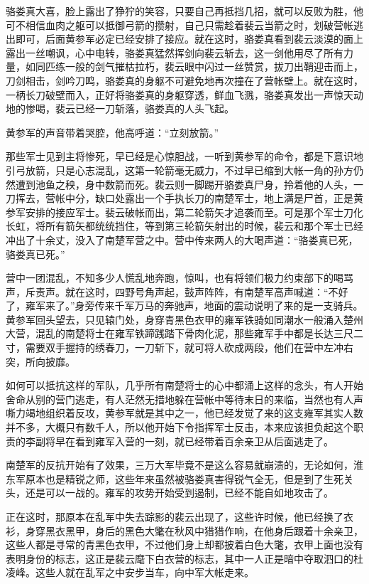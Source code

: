 骆娄真大喜，脸上露出了狰狞的笑容，只要自己再抵挡几招，就可以反败为胜，他可不相信血肉之躯可以抵御弓箭的攒射，自己只需趁着裴云当箭之时，划破营帐逃出即可，后面黄参军必定已经安排了接应。就在这时，骆娄真看到裴云淡漠的面上露出一丝嘲讽，心中电转，骆娄真猛然挥剑向裴云斩去，这一剑他用尽了所有力量，如同匹练一般的剑气摧枯拉朽，裴云眼中闪过一丝赞赏，拔刀出鞘迎击而上，刀剑相击，剑吟刀鸣，骆娄真的身躯不可避免地再次撞在了营帐壁上。就在这时，一柄长刀破壁而入，正好将骆娄真的身躯穿透，鲜血飞溅，骆娄真发出一声惊天动地的惨喝，裴云已经一刀斩落，骆娄真的人头飞起。

黄参军的声音带着哭腔，他高呼道：“立刻放箭。”

那些军士见到主将惨死，早已经是心惊胆战，一听到黄参军的命令，都是下意识地引弓放箭，只是心志混乱，这第一轮箭毫无威力，不过早已缩到大帐一角的孙方仍然遭到池鱼之秧，身中数箭而死。裴云则一脚踢开骆娄真尸身，拎着他的人头，一刀挥去，营帐中分，缺口处露出一个手执长刀的南楚军士，地上满是尸首，正是黄参军安排的接应军士。裴云破帐而出，第二轮箭矢才追袭而至。可是那个军士刀化长虹，将所有箭矢都统统挡住，等到第三轮箭矢射出的时候，裴云和那个军士已经冲出了十余丈，没入了南楚军营之中。营中传来两人的大喝声道：“骆娄真已死，骆娄真已死。”

营中一团混乱，不知多少人慌乱地奔跑，惊叫，也有将领们极力约束部下的喝骂声，斥责声。就在这时，四野号角声起，鼓声阵阵，有南楚军高声喊道：“不好了，雍军来了。”身旁传来千军万马的奔驰声，地面的震动说明了来的是一支骑兵。黄参军回头望去，只见辕门处，身穿青黑色衣甲的雍军铁骑如同潮水一般涌入楚州大营，混乱的南楚将士在雍军铁蹄践踏下骨肉化泥，那些雍军手中都是长达三尺二寸，需要双手握持的绣春刀，一刀斩下，就可将人砍成两段，他们在营中左冲右突，所向披靡。

如何可以抵抗这样的军队，几乎所有南楚将士的心中都涌上这样的念头，有人开始舍命从别的营门逃走，有人茫然无措地躲在营帐中等待末日的来临，当然也有人声嘶力竭地组织着反攻，黄参军就是其中之一，他已经发觉了来的这支雍军其实人数并不多，大概只有数千人，所以他开始下令指挥军士反击，本来应该担负起这个职责的李副将早在看到雍军入营的一刻，就已经带着百余亲卫从后面逃走了。

南楚军的反抗开始有了效果，三万大军毕竟不是这么容易就崩溃的，无论如何，淮东军原本也是精锐之师，这些年来虽然被骆娄真害得锐气全无，但是到了生死关头，还是可以一战的。雍军的攻势开始受到遏制，已经不能自如地攻击了。

正在这时，那原本在乱军中失去踪影的裴云出现了，这些许时候，他已经换了衣衫，身穿黑衣黑甲，身后的黑色大氅在秋风中猎猎作响，在他身后跟着十余亲卫，这些人都是寻常的青黑色衣甲，不过他们身上却都披着白色大氅，衣甲上面也没有表明身份的标志，这正是裴云麾下白衣营的标志，其中一人正是暗中夺取泗口的杜凌峰。这些人就在乱军之中安步当车，向中军大帐走来。

